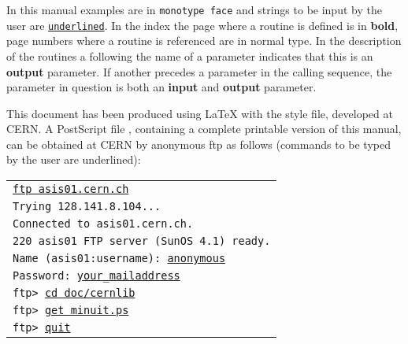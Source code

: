 In this manual
examples are in {\tt monotype face} and strings to be input by the user 
are {\tt\underline{underlined}}.
In the index the page where a routine is defined is in {\bf bold},
page numbers where a routine is referenced are in normal type.
In the description of the routines a \Lit{*} following
the name of a parameter indicates that this is an {\bf output} parameter.
If another \Lit{*} precedes a parameter in the calling sequence, the
parameter in question is both an {\bf input} and {\bf output} parameter.

This document has been produced using \LaTeX\cite{bib-LATEX}
with the  style file, developed at CERN. 
A PostScript file , containing a complete printable version
of this manual, can be obtained at CERN by anonymous ftp as follows
(commands to be typed by the user are underlined):

\vspace*{3mm} 
\begin{tabular}{@{\hspace{12mm}}>{\tt}l}
\underline{ftp asis01.cern.ch}\\
Trying 128.141.8.104...\\
Connected to asis01.cern.ch.\\
220 asis01 FTP server (SunOS 4.1) ready.\\
Name (asis01:username): \underline{anonymous}\\
Password: \underline{your\_{}mailaddress}\\
ftp> \underline{cd doc/cernlib}\\
ftp> \underline{get minuit.ps}\\
ftp> \underline{quit}\\
\end{tabular}

%
% 

\newpage
\tableofcontents
\newpage
\listoffigures
\listoftables
